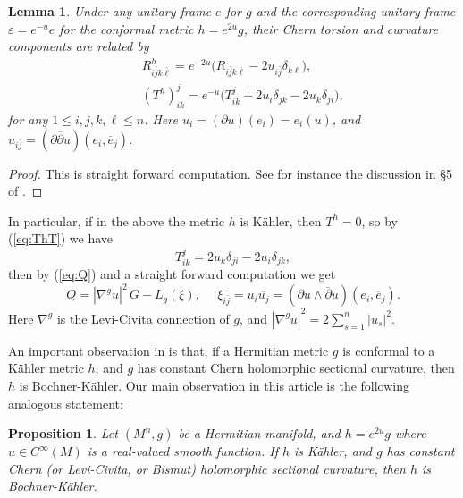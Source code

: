 \documentclass{amsart}
\newtheorem{lemma}{Lemma}
\newtheorem{proposition}{Proposition}
\numberwithin{equation}{section}
\begin{document}
\begin{lemma}
Under any unitary frame $e$ for $g$ and the corresponding unitary frame $\varepsilon=e^{-u}e$ for the conformal metric $h=e^{2u}g$, their Chern torsion and curvature components are related by
\begin{eqnarray}
&& R^h_{i\bar{j}k\bar{\ell}} = e^{-2u} \big( R_{i\bar{j}k\bar{\ell}} - 2u_{i\bar{j}}  \delta_{k\ell} \big),  \label{eq:RhR}\\
&& (T^h)^j_{ik} = e^{-u} \big( T^j_{ik} + 2u_i\delta_{jk} -2 u_k \delta_{ji} \big),  \label{eq:ThT}
\end{eqnarray}
for any $1\leq i,j,k, \ell \leq n$. Here $u_i= (\partial u)(e_i)=e_i(u)$, and $u_{i\bar{j}}= (\partial \overline{\partial } u)(e_i, \overline{e}_j)$.
\end{lemma}

\begin{proof}
This is straight forward computation. See for instance the discussion in \S 5 of \cite{YangZ}.
\end{proof}

In particular, if in the above the metric $h$ is K\"ahler, then $T^h=0$, so by (\ref{eq:ThT}) we have
\begin{equation}  \label{eq:T2}
T^j_{ik} =  2 u_k \delta_{ji} -2u_i\delta_{jk},
\end{equation}
then by (\ref{eq:Q}) and a straight forward computation we get
\begin{equation}  \label{eq:Q2}
Q =  |\nabla^g u|^2 \,G - L_g(\xi), \ \ \ \ \ \ \xi_{i\bar{j}} = u_i \overline{u_j} =(\partial u\wedge \overline{\partial}u)(e_i,\overline{e}_j).
\end{equation}
Here $\nabla^g$ is the Levi-Civita connection of $g$, and $|\nabla^g u|^2=2\sum_{s=1}^n |u_s|^2$.


An important observation in \cite{HW} is that, if a Hermitian metric $g$ is  conformal to a  K\"ahler metric $h$, and $g$ has constant Chern holomorphic sectional curvature, then $h$ is Bochner-K\"ahler. Our main  observation in this article is the following analogous statement:

\begin{proposition}  \label{prop1}
Let $(M^n,g)$ be a Hermitian manifold, and $h=e^{2u}g$ where $u\in C^{\infty}(M)$ is a real-valued smooth function. If $h$ is K\"ahler, and $g$ has constant Chern (or Levi-Civita, or Bismut) holomorphic sectional curvature, then $h$ is Bochner-K\"ahler.
\end{proposition}
\end{document}
